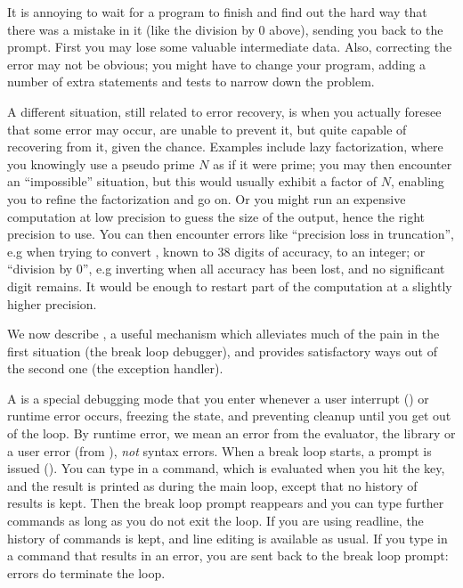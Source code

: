 It is annoying to wait for a program to finish and find out the hard
way that there was a mistake in it (like the division by 0 above), sending
you back to the prompt. First you may lose some valuable intermediate data.
Also, correcting the error may not be obvious; you might have to change your
program, adding a number of extra statements and tests to narrow down
the problem.

A different situation, still related to error recovery, is when you
actually foresee that some error may occur, are unable to prevent it, but
quite capable of recovering from it, given the chance. Examples include lazy
factorization, where you knowingly use a pseudo prime $N$ as if it were
prime; you may then encounter an ``impossible'' situation, but this would
usually exhibit a factor of $N$, enabling you to refine the factorization and
go on. Or you might run an expensive computation at low precision to guess
the size of the output, hence the right precision to use. You can then
encounter errors like ``precision loss in truncation'', e.g when trying to
convert , known to $38$ digits of accuracy, to an integer; or
``division by 0'', e.g inverting  when all accuracy has been
lost, and no significant digit remains. It would be enough to restart part of
the computation at a slightly higher precision.

We now describe , a useful mechanism which alleviates
much of the pain in the first situation (the break loop debugger), and
provides satisfactory ways out of the second one (the  exception
handler).

\label{se:break_loop}

A  is a special debugging mode that you enter whenever a
user interrupt () or runtime error occurs, freezing the
 state, and preventing cleanup until you get out of the loop. By
runtime error, we mean an error from the evaluator, the library or a user error
(from ), \emph{not} syntax errors. When a break loop starts, a
prompt is issued (). You can type in a  command, which is
evaluated when you hit the  key, and the result is printed as
during the main  loop, except that no history of results is kept. Then
the break loop prompt reappears and you can type further commands as long as
you do not exit the loop. If you are using readline, the history of commands is
kept, and line editing is available as usual. If you type in a command that
results in an error, you are sent back to the break loop prompt: errors do
 terminate the loop.

